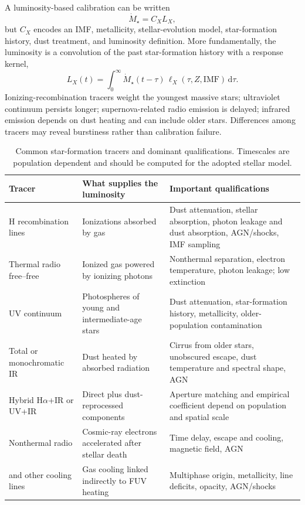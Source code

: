 A luminosity-based calibration can be written
\begin{equation}
 \dot M_\star=C_XL_X,
 \label{eq:sfr-calibration-generic}
\end{equation}
but $C_X$ encodes an IMF, metallicity, stellar-evolution model, star-formation history,
dust treatment, and luminosity definition.  More fundamentally, the luminosity is a
convolution of the past star-formation history with a response kernel,
\begin{equation}
 L_X(t)=\int_0^\infty \dot M_\star(t-\tau)\,
 \ell_X(\tau,Z,\mathrm{IMF})\,\mathrm{d}\tau.
 \label{eq:sfr-response-kernel}
\end{equation}
Ionizing-recombination tracers weight the youngest massive stars; ultraviolet
continuum persists longer; supernova-related radio emission is delayed; infrared
emission depends on dust heating and can include older stars.  Differences among
tracers may reveal burstiness rather than calibration failure.

\begin{table}[tbp]
\centering
\caption{Common star-formation tracers and dominant qualifications.  Timescales are
population dependent and should be computed for the adopted stellar model.}
\label{tab:sfr-tracers}
\begin{tabularx}{\textwidth}{@{}
 >{\raggedright\arraybackslash}p{}
 >{\raggedright\arraybackslash}p{}
 >{\raggedright\arraybackslash}X@{}}
\toprule
Tracer & What supplies the luminosity & Important qualifications \\
\midrule
H recombination lines & Ionizations absorbed by gas & Dust attenuation, stellar
absorption, photon leakage and dust absorption, AGN/shocks, IMF sampling \\
Thermal radio free--free & Ionized gas powered by ionizing photons & Nonthermal
separation, electron temperature, photon leakage; low extinction \\
UV continuum & Photospheres of young and intermediate-age stars & Dust attenuation,
star-formation history, metallicity, older-population contamination \\
Total or monochromatic IR & Dust heated by absorbed radiation & Cirrus from older
stars, unobscured escape, dust temperature and spectral shape, AGN \\
Hybrid H$\alpha$+IR or UV+IR & Direct plus dust-reprocessed components & Aperture
matching and empirical coefficient depend on population and spatial scale \\
Nonthermal radio & Cosmic-ray electrons accelerated after stellar death & Time delay,
escape and cooling, magnetic field, AGN \\
{[C\,II]} and other cooling lines & Gas cooling linked indirectly to FUV heating &
Multiphase origin, metallicity, line deficits, opacity, AGN/shocks \\
\bottomrule
\end{tabularx}
\end{table}

